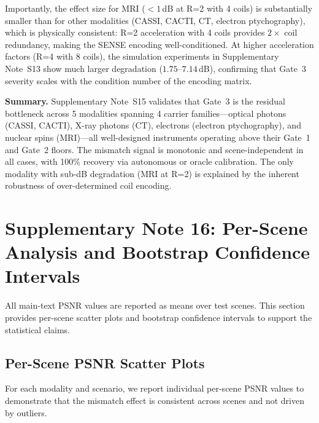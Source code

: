 \documentclass[11pt]{article}
\begin{document}
Importantly, the effect size for MRI ($< 1$\,dB at R=2 with 4 coils) is substantially smaller than for other modalities (CASSI, CACTI, CT, electron ptychography), which is physically consistent: R=2 acceleration with 4 coils provides $2\times$ coil redundancy, making the SENSE encoding well-conditioned.
At higher acceleration factors (R=4 with 8 coils), the simulation experiments in Supplementary Note~S13 show much larger degradation ($1.75$--$7.14$\,dB), confirming that Gate~3 severity scales with the condition number of the encoding matrix.

\vspace{1em}
\noindent\textbf{Summary.} Supplementary Note~S15 validates that Gate~3 is the residual bottleneck across 5 modalities spanning 4 carrier families---optical photons (CASSI, CACTI), X-ray photons (CT), electrons (electron ptychography), and nuclear spins (MRI)---all well-designed instruments operating above their Gate~1 and Gate~2 floors. The mismatch signal is monotonic and scene-independent in all cases, with 100\% recovery via autonomous or oracle calibration. The only modality with sub-dB degradation (MRI at R=2) is explained by the inherent robustness of over-determined coil encoding.


\section{Supplementary Note 16: Per-Scene Analysis and Bootstrap Confidence Intervals}
\label{sec:perscene}

All main-text PSNR values are reported as means over test scenes. This section provides per-scene scatter plots and bootstrap confidence intervals to support the statistical claims.

\subsection{Per-Scene PSNR Scatter Plots}

For each modality and scenario, we report individual per-scene PSNR values to demonstrate that the mismatch effect is consistent across scenes and not driven by outliers.
\end{document}
